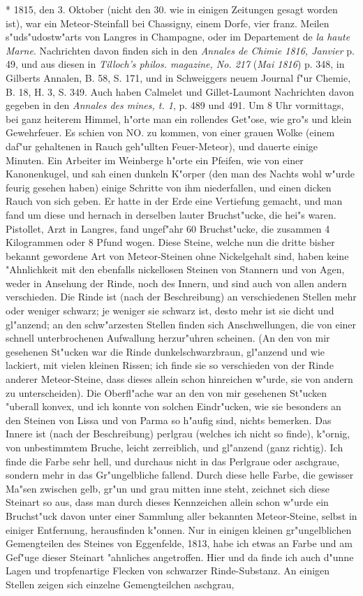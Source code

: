 \documentclass[a4paper, 11pt, oneside, polutonikogreek, german]{article}
\begin{document}
* 1815, den 3. Oktober (nicht den 30. wie in einigen Zeitungen gesagt worden ist), war ein Meteor-Steinfall bei Chassigny, einem Dorfe, vier franz. Meilen s"uds"udostw"arts von Langres in Champagne, oder im Departement de \emph{la haute Marne}. Nachrichten davon finden sich in den \emph{Annales de Chimie 1816, Janvier} p. 49, und aus diesen in \emph{Tilloch's philos. magazine, No. 217} (\emph{Mai 1816}) p. 348, in Gilberts Annalen, B. 58, S. 171, und in Schweiggers neuem Journal f"ur Chemie, B. 18, H. 3, S. 349. Auch haben Calmelet und Gillet-Laumont Nachrichten davon gegeben in den \emph{Annales des mines, t. 1}, p. 489 und 491. Um 8 Uhr vormittags, bei ganz heiterem Himmel, h"orte man ein rollendes Get"ose, wie gro"s und klein Gewehrfeuer. Es schien von NO. zu kommen, von einer grauen Wolke (einem daf"ur gehaltenen in Rauch geh"ullten Feuer-Meteor), und dauerte einige Minuten. Ein Arbeiter im Weinberge h"orte ein Pfeifen, wie von einer Kanonenkugel, und sah einen dunkeln K"orper (den man des Nachts wohl w"urde feurig gesehen haben) einige Schritte von ihm niederfallen, und einen dicken Rauch von sich geben. Er hatte in der Erde eine Vertiefung gemacht, und man fand um diese und hernach in derselben lauter Bruchst"ucke, die hei"s waren. Pistollet, Arzt in Langres, fand ungef"ahr 60 Bruchst"ucke, die zusammen 4 Kilogrammen oder 8 Pfund wogen. Diese Steine, welche nun die dritte bisher bekannt gewordene Art von Meteor-Steinen ohne Nickelgehalt sind, haben keine "Ahnlichkeit mit den ebenfalls nickellosen Steinen von Stannern und von Agen, weder in Ansehung der Rinde, noch des Innern, und sind auch von allen andern verschieden. Die Rinde ist (nach der Beschreibung) an verschiedenen Stellen mehr oder weniger schwarz; je weniger sie schwarz ist, desto mehr ist sie dicht und gl"anzend; an den schw"arzesten Stellen finden sich Anschwellungen, die von einer schnell unterbrochenen Aufwallung herzur"uhren scheinen. (An den von mir gesehenen St"ucken war die Rinde dunkelschwarzbraun, gl"anzend und wie lackiert, mit vielen kleinen Rissen; ich finde sie so verschieden von der Rinde anderer Meteor-Steine, dass dieses allein schon hinreichen w"urde, sie von andern zu unterscheiden). Die Oberfl"ache war an den von mir gesehenen St"ucken "uberall konvex, und ich konnte von solchen Eindr"ucken, wie sie besonders an den Steinen von Lissa und von Parma so h"aufig sind, nichts bemerken. Das Innere ist (nach der Beschreibung) perlgrau (welches ich nicht so finde), k"ornig, von unbestimmtem Bruche, leicht zerreiblich, und gl"anzend (ganz richtig). Ich finde die Farbe sehr hell, und durchaus nicht in das Perlgraue oder aschgraue, sondern mehr in das Gr"ungelbliche fallend. Durch diese helle Farbe, die gewisser Ma"sen zwischen gelb, gr"un und grau mitten inne steht, zeichnet sich diese Steinart so aus, dass man durch dieses Kennzeichen allein schon w"urde ein Bruchst"uck davon unter einer Sammlung aller bekannten Meteor-Steine, selbst in einiger Entfernung, herausfinden k"onnen. Nur in einigen kleinen gr"ungelblichen Gemengteilen des Steines von Eggenfelde, 1813, habe ich etwas an Farbe und am Gef"uge dieser Steinart "ahnliches angetroffen. Hier und da finde ich auch d"unne Lagen und tropfenartige Flecken von schwarzer Rinde-Substanz. An einigen Stellen zeigen sich einzelne Gemengteilchen aschgrau, 
\end{document}
